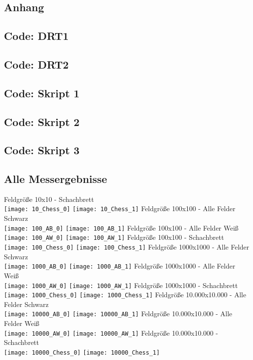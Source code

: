 \documentclass[
10pt, %
a4paper, %
oneside, %
headinclude,footinclude, %
BCOR5mm, %
]{scrartcl}
\begin{document}
\begin{appendix} 
	\clearpage 
	\section{Anhang}
	\subsection{Code: DRT1}
	\subsection{Code: DRT2}
	\subsection{Code: Skript 1}
	\subsection{Code: Skript 2}			
	\subsection{Code: Skript 3}
	\subsection{Alle Messergebnisse}

	Feldgröße 10x10 - Schachbrett\\
	\texttt{[image: 10\_Chess\_0]} 
	\texttt{[image: 10\_Chess\_1]} 
	Feldgröße 100x100 - Alle Felder Schwarz\\
	\texttt{[image: 100\_AB\_0]} 
	\texttt{[image: 100\_AB\_1]} 
	Feldgröße 100x100 - Alle Felder Weiß\\
	\texttt{[image: 100\_AW\_0]} 
	\texttt{[image: 100\_AW\_1]} 
	Feldgröße 100x100 - Schachbrett\\
	\texttt{[image: 100\_Chess\_0]} 
	\texttt{[image: 100\_Chess\_1]} 
	Feldgröße 1000x1000 - Alle Felder Schwarz\\
	\texttt{[image: 1000\_AB\_0]} 
	\texttt{[image: 1000\_AB\_1]} 
	Feldgröße 1000x1000 - Alle Felder Weiß\\
	\texttt{[image: 1000\_AW\_0]} 
	\texttt{[image: 1000\_AW\_1]} 
	Feldgröße 1000x1000 - Schachbrett\\
	\texttt{[image: 1000\_Chess\_0]} 
	\texttt{[image: 1000\_Chess\_1]} 
	Feldgröße 10.000x10.000 - Alle Felder Schwarz\\
	\texttt{[image: 10000\_AB\_0]} 
	\texttt{[image: 10000\_AB\_1]} 
	Feldgröße 10.000x10.000 - Alle Felder Weiß\\
	\texttt{[image: 10000\_AW\_0]} 
	\texttt{[image: 10000\_AW\_1]} 
	Feldgröße 10.000x10.000 - Schachbrett\\
	\texttt{[image: 10000\_Chess\_0]} 
	\texttt{[image: 10000\_Chess\_1]} 
	

\end{appendix}
\end{document}
